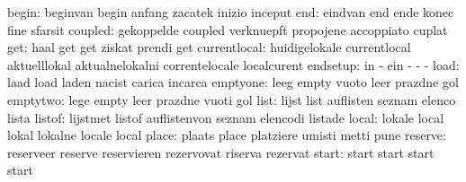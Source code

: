                     begin: beginvan                  begin
                           anfang                    zacatek
                           inizio                    inceput
                      end: eindvan                   end
                           ende                      konec
                           fine                      sfarsit
                  coupled: gekoppelde                coupled
                           verknuepft                propojene
                           accoppiato                cuplat
                      get: haal                      get
                           get                       ziskat
                           prendi                    get
             currentlocal: huidigelokale             currentlocal
                           aktuelllokal              aktualnelokalni
                           correntelocale            localcurent
                 endsetup: in                        -
                           ein                       -
                           -                         -
                     load: laad                      load
                           laden                     nacist
                           carica                    incarca
                 emptyone: leeg                      empty
                           vuoto                     leer
                           prazdne                   gol
                 emptytwo: lege                      empty
                           leer                      prazdne
                           vuoti                     gol
                     list: lijst                     list
                           auflisten                 seznam
                           elenco                    lista
                   listof: lijstmet                  listof
                           auflistenvon              seznam
                           elencodi                  listade
                    local: lokale                    local
                           lokal                     lokalne
                           locale                    local
                    place: plaats                    place
                           platziere                 umisti
                           metti                     pune
                  reserve: reserveer                 reserve
                           reservieren               rezervovat
                           riserva                   rezervat
                    start: start                     start
                           start                     start
